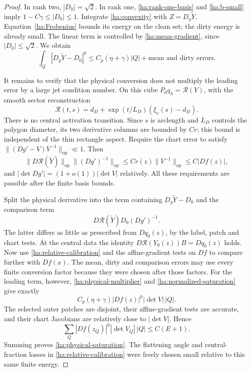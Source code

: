 \documentclass[11pt]{article}
\numberwithin{equation}{section}
\theoremstyle{definition}
\theoremstyle{remark}
\begin{document}
\begin{proof}
In rank two, $|D_0|=\sqrt2$.  In rank one,
\eqref{ha:rank-one-basis} and \eqref{ha:b-small} imply
$1-C\gamma\le|D_0|\le1$.  Integrate
\eqref{ha:convexity} with $Z=D_y\widetilde Y$.
Equation~\eqref{ha:Frobenius} bounds its energy on the clean set;
the dirty energy is already small.  The linear term is controlled
by \eqref{ha:mean-gradient}, since $|D_0|\le\sqrt2$.  We obtain
\begin{equation}\label{ha:normalized-saturation}
 \int_Q|D_y\widetilde Y-D_0|^p
      \le C_p(\eta+\gamma)|Q|
                   +\text{mean and dirty errors}.
\end{equation}

It remains to verify that the physical conversion does not multiply
the leading error by a large jet condition number.  On this cube
$P_0q_h=\mathcal R(Y)$, with the smooth sector reconstruction
\[
       \mathcal R(t,s)=d_D+\exp(t/L_D)(\xi_e(s)-d_D).
\]
There is no central activation transition.  Since $s$ is arclength
and $L_D$ controls the polygon diameter, its two derivative columns
are bounded by $Cr$; this bound is independent of the thin
rectangle aspect.  Require the chart error to satisfy
$\|(Dg'-V)V^{-1}\|_{\mathrm{op}}\ll1$.  Then
\begin{equation}\label{ha:physical-multiplier}
 \|D\mathcal R(\widetilde Y)\|_{\mathrm{op}}
       \|(Dg')^{-1}\|_{\mathrm{op}}
       \le Cr(z)\|V^{-1}\|_{\mathrm{op}}
       \le C|Df(z)|,
\end{equation}
and $|\det Dg'|=(1+o(1))|\det V|$ relatively.  All these
requirements are possible after the finite basis bounds.

Split the physical derivative into the term containing
$D_y\widetilde Y-D_0$ and the comparison term
\[
             D\mathcal R(\widetilde Y)D_0(Dg')^{-1}.
\]
The latter differs as little as prescribed from $Dq_0(z)$, by the
label, patch and chart tests.  At the central data the identity
$D\mathcal R(Y_0(z))B=Dq_0(z)$ holds.  Now use
\eqref{ha:relative-calibration} and the affine-gradient tests on
$Df$ to compare further with $Df(x)$.  The mean, dirty and comparison
errors may use every finite conversion factor because they were
chosen after those factors.  For the leading term, however,
\eqref{ha:physical-multiplier} and
\eqref{ha:normalized-saturation} give exactly
\[
          C_p(\eta+\gamma)
                      |Df(z)|^p|\det V|\,|Q|.
\]
The selected outer patches are disjoint, their affine-gradient
tests are accurate, and their chart Jacobians are relatively close
to $|\det V|$.  Hence
\[
                  \sum_Q|Df(z_Q)|^p|\det V_Q|\,|Q|
                         \le C(E+1).
\]
Summing proves \eqref{ha:physical-saturation}.  The flattening angle
and central-fraction losses in \eqref{ha:relative-calibration} were
freely chosen small relative to this same finite energy.
\end{proof}
\end{document}
